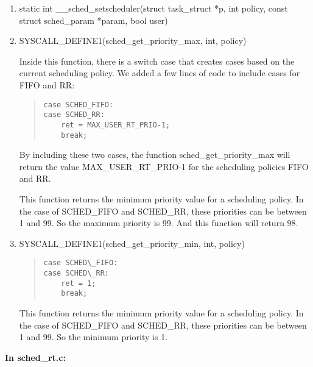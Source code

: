 \documentclass[letterpaper,10pt,titlepage]{article}
\begin{document}
\begin{enumerate}
\item static int \_\_sched\_setscheduler(struct task\_struct *p, int policy, const struct sched\_param *param, bool user)

\item SYSCALL\_DEFINE1(sched\_get\_priority\_max, int, policy)

Inside this function, there is a switch case that creates cases based on the current scheduling policy. We added a few lines of code to include cases for FIFO and RR:
\begin{quotation}
\begin{lstlisting}
case SCHED_FIFO:
case SCHED_RR:
    ret = MAX_USER_RT_PRIO-1;
    break;
\end{lstlisting}
\end{quotation}
  
By including these two cases, the function sched\_get\_priority\_max will return the value MAX\_USER\_RT\_PRIO-1 for the scheduling policies FIFO and RR.

This function returns the minimum priority value for a scheduling policy. In the case of SCHED\_FIFO and SCHED\_RR, these priorities can be between 1 and 99. So the maximum priority is 99. And this function will return 98.


\item SYSCALL\_DEFINE1(sched\_get\_priority\_min, int, policy)


\begin{quotation}
\begin{lstlisting}
case SCHED\_FIFO:
case SCHED\_RR:
    ret = 1;
    break;
\end{lstlisting}
\end{quotation}
This function returns the minimum priority value for a scheduling policy. In the case of SCHED\_FIFO and SCHED\_RR, these priorities can be between 1 and 99. So the minimum priority is 1.\\
\end{enumerate}

{\bfseries In sched\_rt.c:}
\end{document}

